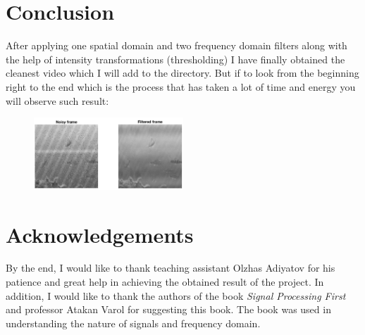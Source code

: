 \documentclass{IEEEtran}
\begin{document}
\section{Conclusion}
After applying one spatial domain and two frequency domain filters along with the help of intensity transformations (thresholding) I have finally obtained the cleanest video which I will add to the directory. But if to look from the beginning right to the end which is the process that has taken a lot of time and energy you will observe such result:

\begin{figure}[h]
	\centering
	\includegraphics[width=0.5\textwidth]{final.png}
\end{figure}

\section{Acknowledgements}
By the end, I would like to thank teaching assistant Olzhas Adiyatov for his patience and great help in achieving the obtained result of the project. In addition, I would like to thank the authors of the book \textit{Signal Processing First} and professor Atakan Varol for suggesting this book. The book was used in understanding the nature of signals and frequency domain.
\end{document}

